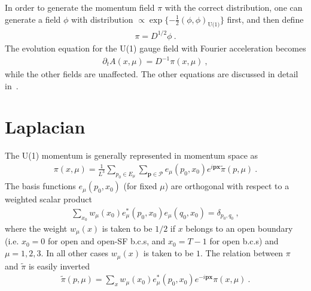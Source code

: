 \documentclass[11pt,fleqn]{article}
\renewcommand{\vec}[1]{\mathbf{#1}}
\begin{document}
In order to generate the momentum field $\pi$ with the correct distribution, one can generate a field $\phi$ with distribution $\propto \exp \{ - \frac{1}{2} ( \phi , \phi )_\text{U(1)} \}$ first, and then define
\begin{gather}
   \pi = D^{1/2} \phi \ .
\end{gather}
The evolution equation for the U(1) gauge field with Fourier acceleration becomes
\begin{gather}
   \partial_t A(x,\mu) = D^{-1} \pi(x,\mu) \ ,
\end{gather}
while the other fields are unaffected. The other equations are discussed in detail in~\cite{rhmc}.


\section{Laplacian}
\label{sec:laplacian}

The U(1) momentum is generally represented in momentum space as
\begin{gather}
   \pi(x,\mu) = \frac{1}{L^3} \sum_{p_0 \in E_\mu} \sum_{\vec{p} \in \mathcal{P}} e_\mu(p_0,x_0) e^{i \vec{p} \vec{x}} \tilde{\pi}(p,\mu) \ .
\end{gather}
The basis functions $e_\mu(p_0,x_0)$ (for fixed $\mu$) are orthogonal with respect to a weighted scalar product
\begin{gather}
   \sum_{x_0} w_\mu(x_0) e_\mu^*(p_0,x_0) e_\mu(q_0,x_0) = \delta_{p_0,q_0} \ ,
\end{gather}
where the weight $w_\mu(x)$ is taken to be $1/2$ if $x$ belongs to an open boundary (i.e. $x_0=0$ for open and open-SF b.c.s, and $x_0=T-1$ for open b.c.s) and $\mu=1,2,3$. In all other cases $w_\mu(x)$ is taken to be $1$. The relation between $\pi$ and $\tilde{\pi}$ is easily inverted
\begin{gather}
   \tilde{\pi}(p,\mu)
   =
   \sum_{x} w_\mu(x_0) e_\mu^*(p_0,x_0) e^{-i \vec{p} \vec{x}} \pi(x,\mu) \ .
\end{gather}
\end{document}
